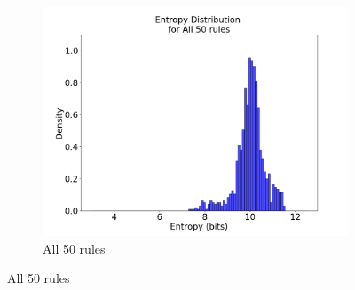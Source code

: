 \documentclass{article}
\begin{document}
\begin{figure}[H]
\begin{subfigure}{0.32\textwidth}
    \includegraphics[width=\linewidth]{figures/IMDB_entropy_distribution_plots/entropy_distribution_ft_all50rules.png}
    \caption{All 50 rules}
\end{subfigure}


\end{figure}
\end{document}

